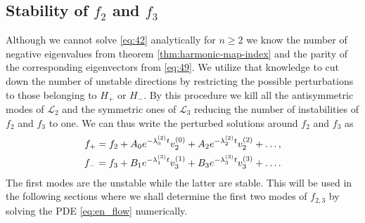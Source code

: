 \subsection{Stability of $f_2$ and $f_3$}
\label{sec:stability-f_2-f_3}

Although we cannot solve \eqref{eq:42} analytically for $n\ge2$ we
know the number of negative eigenvalues from theorem
\ref{thm:harmonic-map-index} and the parity of the corresponding
eigenvectors from \eqref{eq:49}. We utilize that knowledge to cut down
the number of unstable directions by restricting the possible
perturbations to those belonging to $H_+$ or $H_-$. By this procedure
we kill all the antisymmetric modes of $\mathcal{L}_2$ and the
symmetric ones of $\mathcal{L}_3$ reducing the number of instabilities
of $f_2$ and $f_3$ to one. We can thus write the perturbed solutions
around $f_2$ and $f_3$ as
\begin{align}
  \label{eq:69}
  f_+=f_2+A_0e^{-\lb{2}{0}t}\vn{2}{0}+A_2e^{-\lb{2}{2}t}\vn{2}{2}+\dots,\\
  \label{eq:70}
  f_-=f_3+B_1e^{-\lb{3}{1}t}\vn{3}{1}+B_3e^{-\lb{3}{3}t}\vn{3}{3}+\dots.
\end{align}
The first modes are the unstable while the latter are stable. This
will be used in the following sections where we shall determine the
first two modes of $f_{2,3}$ by solving the PDE \eqref{eq:en_flow}
numerically.



